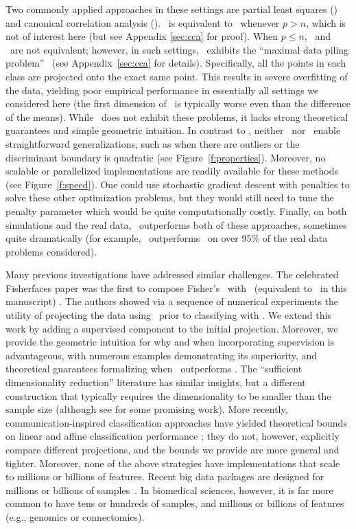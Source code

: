 \documentclass[11pt]{extarticle}
\begin{document}
Two commonly applied approaches in these settings are partial least squares (\Pls) and canonical correlation analysis (\Cca). \Cca~is equivalent to \Lda~whenever $p>n$, which is not of interest here (but see Appendix \ref{sec:cca} for proof).  When $p\le n$, \Cca~and \Lda~are not equivalent; however, in such settings, \Cca~exhibits the ``maximal data piling problem''~\cite{maximum1}  (see Appendix~\ref{sec:cca} for details).  Specifically, all the points in each class are projected onto the exact same point. This results in severe overfitting of the data, yielding poor empirical performance in essentially all settings we considered here (the first dimension of \Cca~is typically worse even than the difference of the means).  While \Pls~does not exhibit these problems, it lacks strong theoretical guarantees and simple geometric intuition.  In contrast to \Lol, neither \Cca~nor \Pls~enable straightforward generalizations, such as when there are outliers or the discriminant boundary is quadratic (see Figure~\ref{f:properties}). Moreover, no scalable or parallelized implementations are readily available for these methods (see Figure~\ref{f:speed}). One could use stochastic gradient descent with penalties to solve these other optimization problems, but they would still need to tune the penalty parameter which would be quite computationally costly. Finally, on both simulations and the real data, \Lol~outperforms both of these approaches, sometimes quite dramatically (for example, \Lol~outperforms \Cca~on over 95\% of the real data problems considered).

%
Many previous investigations have addressed similar challenges.
The celebrated Fisherfaces paper was the first to compose Fisher's \Lda~with \Pca~(equivalent to \Pca~in this manuscript) \cite{Belhumeur1997a}.  The authors showed via a sequence of numerical experiments the utility of projecting the data using \Pca~prior to classifying with \Lda.  
We extend this work by adding a supervised component to the initial projection.  Moreover, we provide the geometric intuition for why and when incorporating supervision is advantageous, with numerous examples demonstrating its superiority, and theoretical guarantees formalizing when \Lol~outperforms \Pca.
The ``sufficient dimensionality reduction'' literature has  similar insights, but a different construction that typically requires the dimensionality to be smaller than the sample size \cite{Li1991a, Tishby1999a, Globerson2003a, Cook2005a,Fukumizu2004a} (although see \cite{Cook2013} for some promising work). More recently, communication-inspired classification approaches have yielded theoretical bounds on linear and affine classification performance \cite{Nokleby2015}; they do not, however, explicitly compare different projections, and the bounds we provide are more general and tighter.
%
Moreover, none of the above strategies have implementations that scale to millions or billions of features.
Recent big data packages are designed for millions or billions of  samples~\cite{Agarwal2014,abadi2016tensorflow}.  In biomedical sciences, however, it is far more common to have tens or hundreds of samples, and millions or billions of features (e.g., genomics or connectomics).
\end{document}
